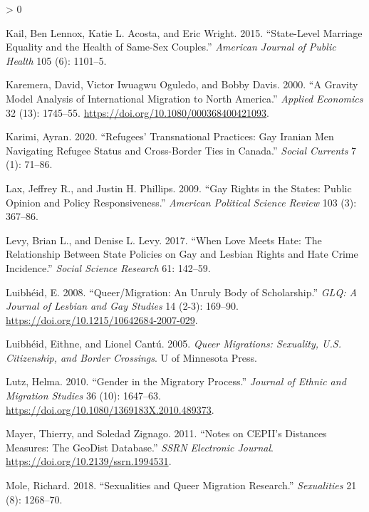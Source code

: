 \documentclass[
  11pt,
]{article}
\newlength{\cslhangindent}
\newenvironment{CSLReferences}[2] %
 {%
  \setlength{\parindent}{0pt}
  \ifodd #1 \everypar{\setlength{\hangindent}{\cslhangindent}}\ignorespaces\fi
  \ifnum #2 > 0
  \setlength{\parskip}{#2\baselineskip}
  \fi
 }%
 {}
\begin{document}
\begin{CSLReferences}{1}{0}
\leavevmode\hypertarget{ref-kail_2015}{}%
Kail, Ben Lennox, Katie L. Acosta, and Eric Wright. 2015. {``State-Level Marriage Equality and the Health of Same-Sex Couples.''} \emph{American Journal of Public Health} 105 (6): 1101--5.

\leavevmode\hypertarget{ref-karemera_2000}{}%
Karemera, David, Victor Iwuagwu Oguledo, and Bobby Davis. 2000. {``A Gravity Model Analysis of International Migration to {North} {America}.''} \emph{Applied Economics} 32 (13): 1745--55. \url{https://doi.org/10.1080/000368400421093}.

\leavevmode\hypertarget{ref-karimi_2020}{}%
Karimi, Ayran. 2020. {``Refugees' {Transnational} {Practices}: {Gay} {Iranian} {Men} {Navigating} {Refugee} {Status} and {Cross}-Border {Ties} in {Canada}.''} \emph{Social Currents} 7 (1): 71--86.

\leavevmode\hypertarget{ref-lax_2009}{}%
Lax, Jeffrey R., and Justin H. Phillips. 2009. {``Gay Rights in the States: {Public} Opinion and Policy Responsiveness.''} \emph{American Political Science Review} 103 (3): 367--86.

\leavevmode\hypertarget{ref-levy_2017}{}%
Levy, Brian L., and Denise L. Levy. 2017. {``When {Love} {Meets} {Hate}: {The} {Relationship} {Between} {State} {Policies} on {Gay} and {Lesbian} {Rights} and {Hate} {Crime} {Incidence}.''} \emph{Social Science Research} 61: 142--59.

\leavevmode\hypertarget{ref-luibheid_2008}{}%
Luibhéid, E. 2008. {``Queer/{Migration}: {An} {Unruly} {Body} of {Scholarship}.''} \emph{GLQ: A Journal of Lesbian and Gay Studies} 14 (2-3): 169--90. \url{https://doi.org/10.1215/10642684-2007-029}.

\leavevmode\hypertarget{ref-luibheid_2005}{}%
Luibhéid, Eithne, and Lionel Cantú. 2005. \emph{Queer {Migrations}: {Sexuality}, {U}.{S}. {Citizenship}, and {Border} {Crossings}}. U of Minnesota Press.

\leavevmode\hypertarget{ref-lutz_2010}{}%
Lutz, Helma. 2010. {``Gender in the {Migratory} {Process}.''} \emph{Journal of Ethnic and Migration Studies} 36 (10): 1647--63. \url{https://doi.org/10.1080/1369183X.2010.489373}.

\leavevmode\hypertarget{ref-mayer_2011}{}%
Mayer, Thierry, and Soledad Zignago. 2011. {``Notes on {CEPII}'s {Distances} {Measures}: {The} {GeoDist} {Database}.''} \emph{SSRN Electronic Journal}. \url{https://doi.org/10.2139/ssrn.1994531}.

\leavevmode\hypertarget{ref-mole_2018a}{}%
Mole, Richard. 2018. {``Sexualities and Queer Migration Research.''} \emph{Sexualities} 21 (8): 1268--70.


\end{CSLReferences}
\end{document}
